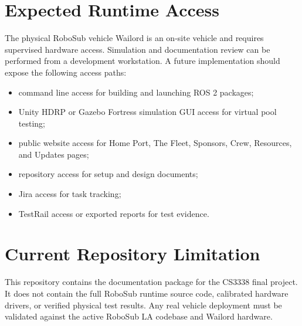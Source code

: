 \documentclass[12pt]{article}
\begin{document}
\section{Expected Runtime Access}
The physical RoboSub vehicle Wailord is an on-site vehicle and requires supervised hardware access. Simulation and documentation review can be performed from a development workstation. A future implementation should expose the following access paths:
\begin{itemize}[leftmargin=*]
  \item command line access for building and launching ROS 2 packages;
  \item Unity HDRP or Gazebo Fortress simulation GUI access for virtual pool testing;
  \item public website access for Home Port, The Fleet, Sponsors, Crew, Resources, and Updates pages;
  \item repository access for setup and design documents;
  \item Jira access for task tracking;
  \item TestRail access or exported reports for test evidence.
\end{itemize}

\section{Current Repository Limitation}
This repository contains the documentation package for the CS3338 final project. It does not contain the full RoboSub runtime source code, calibrated hardware drivers, or verified physical test results. Any real vehicle deployment must be validated against the active RoboSub LA codebase and Wailord hardware.
\end{document}
